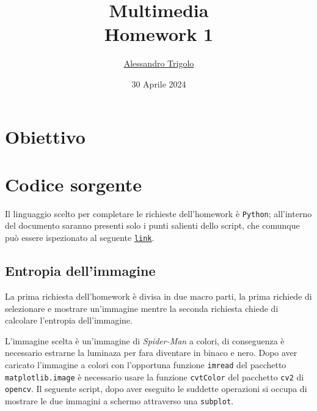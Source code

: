 \title{\vspace{160px} \textbf{\huge{Multimedia}} \\\vspace{17.5px} \LARGE{Homework 1}  \vspace{10px}}
\author{\href{https://github.com/imAlessas}{Alessandro Trigolo}}
\date{30 Aprile 2024}



\maketitle\newpage

\tableofcontents\newpage

\listoftodos\newpage


\section{Obiettivo}



\vspace{30px}\section{Codice sorgente}
Il linguaggio scelto per completare le richieste dell'homework è \texttt{Python}; all'interno del documento saranno presenti solo i punti salienti dello script, che comunque può essere ispezionato al seguente \href{https://github.com/imAlessas/computer-networks/blob/main/multimedia/hw-1/script/lossless_coding.py}{\texttt{link}}.



\vspace{15px}\subsection{Entropia dell'immagine}
La prima richiesta dell'homework è divisa in due macro parti, la prima richiede di selezionare e mostrare un'immagine mentre la seconda richiesta chiede di calcolare l'entropia dell'immagine.

L'immagine scelta è un'immagine di \textsl{Spider-Man} a colori, di conseguenza è necessario estrarne la luminaza per fara diventare in binaco e nero. Dopo aver caricato l'immagine a colori con l'opportuna funzione \texttt{imread} del pacchetto \texttt{matplotlib.image} è necessario usare la funzione \texttt{cvtColor} del pacchetto \texttt{cv2} di \texttt{opencv}. Il seguente script, dopo aver eseguito le suddette operazioni si occupa di mostrare le due immagini a schermo attraverso una \texttt{subplot}.

